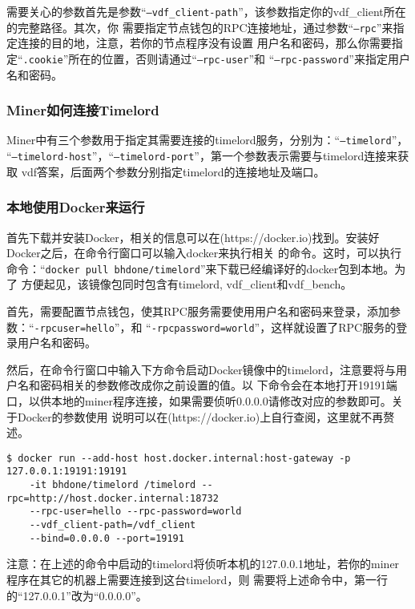 \normalsize
\begin{flushleft}
    需要关心的参数首先是参数``\texttt{--vdf_client-path}''，该参数指定你的vdf\_client所在的完整路径。其次，你
    需要指定节点钱包的RPC连接地址，通过参数``\texttt{--rpc}''来指定连接的目的地，注意，若你的节点程序没有设置
    用户名和密码，那么你需要指定``\texttt{.cookie}''所在的位置，否则请通过``\texttt{--rpc-user}''和
    ``\texttt{--rpc-password}''来指定用户名和密码。
\end{flushleft}
\subsubsection{Miner如何连接Timelord}
\begin{flushleft}
    Miner中有三个参数用于指定其需要连接的timelord服务，分别为：``\texttt{--timelord}''，
    ``\texttt{--timelord-host}''，``\texttt{--timelord-port}''，第一个参数表示需要与timelord连接来获取
    vdf答案，后面两个参数分别指定timelord的连接地址及端口。
\end{flushleft}
\subsubsection{本地使用Docker来运行}
\begin{flushleft}
    首先下载并安装Docker，相关的信息可以在(https://docker.io)找到。安装好Docker之后，在命令行窗口可以输入docker来执行相关
    的命令。这时，可以执行命令：``\texttt{docker pull bhdone/timelord}''来下载已经编译好的docker包到本地。为了
    方便起见，该镜像包同时包含有timelord, vdf\_client和vdf\_bench。
\end{flushleft}
\begin{flushleft}
    首先，需要配置节点钱包，使其RPC服务需要使用用户名和密码来登录，添加参数：``\texttt{-rpcuser=hello}''，和
    ``\texttt{-rpcpassword=world}''，这样就设置了RPC服务的登录用户名和密码。
\end{flushleft}
\begin{flushleft}
    然后，在命令行窗口中输入下方命令启动Docker镜像中的timelord，注意要将与用户名和密码相关的参数修改成你之前设置的值。以
    下命令会在本地打开19191端口，以供本地的miner程序连接，如果需要侦听0.0.0.0请修改对应的参数即可。关于Docker的参数使用
    说明可以在(https://docker.io)上自行查阅，这里就不再赘述。
\end{flushleft}
\scriptsize
\begin{verbatim}
$ docker run --add-host host.docker.internal:host-gateway -p 127.0.0.1:19191:19191
    -it bhdone/timelord /timelord --rpc=http://host.docker.internal:18732
    --rpc-user=hello --rpc-password=world
    --vdf_client-path=/vdf_client
    --bind=0.0.0.0 --port=19191
\end{verbatim}
\normalsize
\begin{flushleft}
    注意：在上述的命令中启动的timelord将侦听本机的127.0.0.1地址，若你的miner程序在其它的机器上需要连接到这台timelord，则
    需要将上述命令中，第一行的``127.0.0.1''改为``0.0.0.0''。
\end{flushleft}
